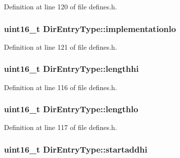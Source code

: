 Definition at line 120 of file defines.\+h.

\subsubsection[{\texorpdfstring{implementationlo}{implementationlo}}]{\setlength{\rightskip}{0pt plus 5cm}uint16\+\_\+t Dir\+Entry\+Type\+::implementationlo}\hypertarget{structDirEntryType_a8164d577c06fb7c312aaa4955d491449}{}\label{structDirEntryType_a8164d577c06fb7c312aaa4955d491449}


Definition at line 121 of file defines.\+h.

\subsubsection[{\texorpdfstring{lengthhi}{lengthhi}}]{\setlength{\rightskip}{0pt plus 5cm}uint16\+\_\+t Dir\+Entry\+Type\+::lengthhi}\hypertarget{structDirEntryType_ad7aaba7b01038bc8bacb096bd66fff08}{}\label{structDirEntryType_ad7aaba7b01038bc8bacb096bd66fff08}


Definition at line 116 of file defines.\+h.

\subsubsection[{\texorpdfstring{lengthlo}{lengthlo}}]{\setlength{\rightskip}{0pt plus 5cm}uint16\+\_\+t Dir\+Entry\+Type\+::lengthlo}\hypertarget{structDirEntryType_ad1cde25a0229866557cd5983c27fbd31}{}\label{structDirEntryType_ad1cde25a0229866557cd5983c27fbd31}


Definition at line 117 of file defines.\+h.

\subsubsection[{\texorpdfstring{startaddhi}{startaddhi}}]{\setlength{\rightskip}{0pt plus 5cm}uint16\+\_\+t Dir\+Entry\+Type\+::startaddhi}\hypertarget{structDirEntryType_a0cab2915e9f864e25b24d298c36c11db}{}\label{structDirEntryType_a0cab2915e9f864e25b24d298c36c11db}


